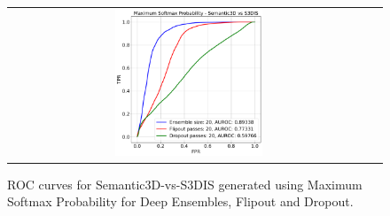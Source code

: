 \begin{figure}
\begin{tabular}{cc}
            \includegraphics[width = 0.42\textwidth, height= 0.3\textheight]{images/AUROC/MSP_20.pdf} \\
        \end{tabular}
        \caption{ROC curves for Semantic3D-vs-S3DIS generated using Maximum Softmax Probability for Deep Ensembles, Flipout and Dropout.}
        \label{fig:roc_msp_ood_1}
    \end{figure}
